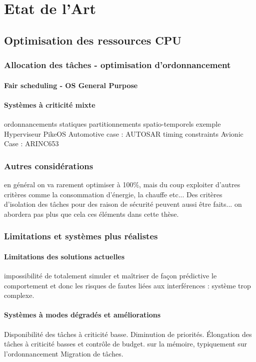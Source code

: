\documentclass[french, a4paper, 11pt, twoside, pdftex]{StyleThese}
\begin{document}
\setcounter{chapter}{2} %
\dominitoc
\faketableofcontents
\fi

\chapter{Etat de l'Art} \label{chap:2_StateofArt}
\minitoc

\section{Optimisation des ressources CPU}
    \subsection{Allocation des tâches - optimisation d'ordonnancement}
    
        \subsubsection{Fair scheduling - OS General Purpose}
        \subsubsection{Systèmes à criticité mixte}
                ordonnancements statiques
        partitionnements spatio-temporels
            exemple Hyperviseur PikeOS
        Automotive case : AUTOSAR
            timing constraints
        Avionic Case : ARINC653
    \subsection{Autres considérations}
        en général on va rarement optimiser à 100\%, mais du coup exploiter d'autres critères comme la consommation d'énergie, la chauffe etc... Des critères d'isolation des tâches pour des raison de sécurité peuvent aussi être faits... on abordera pas plus que cela ces éléments dans cette thèse.
\subsection{Limitations et systèmes plus réalistes}
    \subsubsection{Limitations des solutions actuelles}
    impossibilité de totalement simuler et maîtriser de façon prédictive le comportement et donc les risques de fautes liées aux interférences : système trop complexe.
    \subsubsection{Systèmes à modes dégradés et améliorations}
    Disponibilité des tâches à criticité basse.
    Diminution de priorités.
    Élongation des tâches à criticité basses et contrôle de budget. sur la mémoire, \cite{blin_vers_2017} typiquement
            sur l'ordonnancement
    Migration de tâches.



\ifdefined{}
\else


\end{document}
